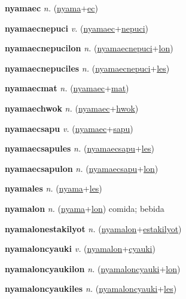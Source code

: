 \textbf{\hypertarget{nyamaec}{nyamaec}} \textit{n.} (\hyperlink{nyama}{nyama}+\allowbreak \hyperlink{ec}{ec})


\textbf{\hypertarget{nyamaecnepuci}{nyamaecnepuci}} \textit{v.} (\hyperlink{nyamaec}{nyamaec}+\allowbreak \hyperlink{nepuci}{nepuci})


\textbf{\hypertarget{nyamaecnepucilon}{nyamaecnepucilon}} \textit{n.} (\hyperlink{nyamaecnepuci}{nyamaecnepuci}+\allowbreak \hyperlink{lon}{lon})


\textbf{\hypertarget{nyamaecnepuciles}{nyamaecnepuciles}} \textit{n.} (\hyperlink{nyamaecnepuci}{nyamaecnepuci}+\allowbreak \hyperlink{les}{les})


\textbf{\hypertarget{nyamaecmat}{nyamaecmat}} \textit{n.} (\hyperlink{nyamaec}{nyamaec}+\allowbreak \hyperlink{mat}{mat})


\textbf{\hypertarget{nyamaechwok}{nyamaechwok}} \textit{n.} (\hyperlink{nyamaec}{nyamaec}+\allowbreak \hyperlink{hwok}{hwok})


\textbf{\hypertarget{nyamaecsapu}{nyamaecsapu}} \textit{v.} (\hyperlink{nyamaec}{nyamaec}+\allowbreak \hyperlink{sapu}{sapu})


\textbf{\hypertarget{nyamaecsapules}{nyamaecsapules}} \textit{n.} (\hyperlink{nyamaecsapu}{nyamaecsapu}+\allowbreak \hyperlink{les}{les})


\textbf{\hypertarget{nyamaecsapulon}{nyamaecsapulon}} \textit{n.} (\hyperlink{nyamaecsapu}{nyamaecsapu}+\allowbreak \hyperlink{lon}{lon})


\textbf{\hypertarget{nyamales}{nyamales}} \textit{n.} (\hyperlink{nyama}{nyama}+\allowbreak \hyperlink{les}{les})


\textbf{\hypertarget{nyamalon}{nyamalon}} \textit{n.} (\hyperlink{nyama}{nyama}+\allowbreak \hyperlink{lon}{lon})
comida; bebida

\textbf{\hypertarget{nyamalonestakilyot}{nyamalonestakilyot}} \textit{n.} (\hyperlink{nyamalon}{nyamalon}+\allowbreak \hyperlink{estakilyot}{estakilyot})


\textbf{\hypertarget{nyamaloncyauki}{nyamaloncyauki}} \textit{v.} (\hyperlink{nyamalon}{nyamalon}+\allowbreak \hyperlink{cyauki}{cyauki})


\textbf{\hypertarget{nyamaloncyaukilon}{nyamaloncyaukilon}} \textit{n.} (\hyperlink{nyamaloncyauki}{nyamaloncyauki}+\allowbreak \hyperlink{lon}{lon})


\textbf{\hypertarget{nyamaloncyaukiles}{nyamaloncyaukiles}} \textit{n.} (\hyperlink{nyamaloncyauki}{nyamaloncyauki}+\allowbreak \hyperlink{les}{les})


